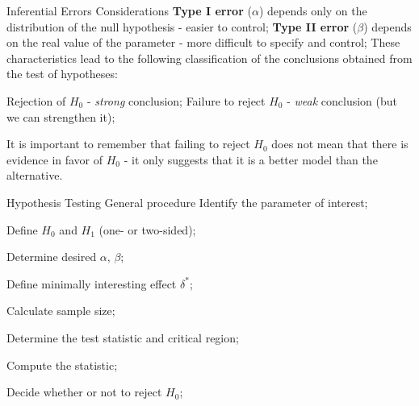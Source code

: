 \documentclass[t]{beamer}
\begin{document}

\begin{ftst}
{Inferential Errors}
{Considerations}
\textbf{Type I error} ($\alpha$) depends only on the distribution of the null hypothesis - easier to control;
\vone
\textbf{Type II error} ($\beta$) depends on the real value of the parameter - more difficult to specify and control;
\vone
These characteristics lead to the following classification of the conclusions obtained from the test of hypotheses:
\begin{block}{}
\bitems Rejection of $H_0$ - \textit{strong} conclusion; 
\spitem Failure to reject $H_0$ - \textit{weak} conclusion (but we can strengthen it);
\eitem
\end{block}
\vone
It is important to remember that failing to reject $H_0$ does not mean that there is evidence in favor of $H_0$ - it only suggests that it is a better model than the alternative.
\end{ftst}


\begin{ftst}
{Hypothesis Testing}
{General procedure}
\bitems Identify the parameter of interest;
	\item Define $H_0$ and $H_1$ (one- or two-sided);
	\item Determine desired $\alpha$, $\beta$;
	\item Define minimally interesting effect $\delta^*$;
	\item Calculate sample size;
	\item Determine the test statistic and critical region;
	\item Compute the statistic;
	\item Decide whether or not to reject $H_0$;
\eitem

\end{ftst}

\end{document}
